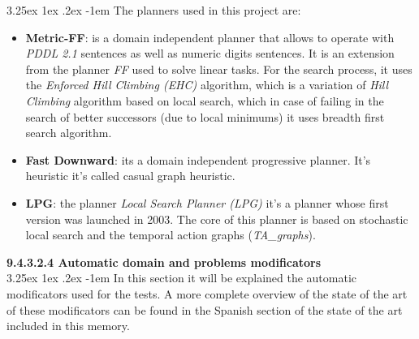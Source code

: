 \documentclass{article}
\makeatletter
\renewcommand\paragraph{\@startsection{paragraph}{5}{\z@}%
      {3.25ex \@plus1ex \@minus.2ex}%
      {-1em}%
      {\normalfont\normalsize\bfseries}}
\makeatother
\begin{document}
    \paragraph{}
    The planners used in this project are:
    \begin{itemize}
        \item \textbf{Metric-FF}: is a domain independent planner that allows to operate with \textit{PDDL 2.1} sentences as well as numeric digits sentences. It is an extension from the planner \textit{FF} used to solve linear tasks. For the search process, it uses the \textit{Enforced Hill Climbing (EHC)} algorithm, which is a variation of \textit{Hill Climbing} algorithm based on local search, which in case of failing in the search of better successors (due to local minimums) it uses breadth first search algorithm.
        \item \textbf{Fast Downward}: its a domain independent progressive planner. It's heuristic it's called casual graph heuristic.
        \item \textbf{LPG}: the planner \textit{Local Search Planner (LPG)} it's a planner whose first version was launched in 2003. The core of this planner is based on stochastic local search and the temporal action graphs (\textit{TA_graphs}).
    \end{itemize}
    
    \textbf{9.4.3.2.4 Automatic domain and problems modificators} \\
    \paragraph{}
    In this section it will be explained the automatic modificators used for the tests. A more complete overview of the state of the art of these modificators can be found in the Spanish section of the state of the art included in this memory.
    
\end{document}
